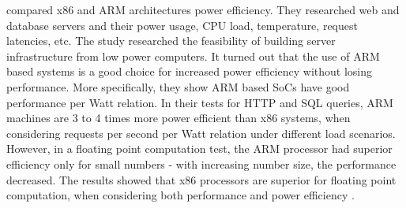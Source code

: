 \citeauthor{aroca2012towards} \cite{aroca2012towards}
compared x86 and ARM architectures power efficiency.
They researched web and database servers and their power usage, CPU load,
temperature, request latencies, etc.
The study researched the feasibility of building server infrastructure
from low power computers. It turned out that the use of ARM based systems
is a good choice for increased power efficiency without losing performance.
More specifically, they show ARM based SoCs have good performance per Watt relation.
In their tests for HTTP and SQL queries, ARM machines are 3 to 4 times
more power efficient than x86 systems, when considering 
requests per second per Watt relation under different load scenarios.
However, in a floating point computation test, the ARM processor had 
superior efficiency only for small numbers - with increasing number size,
the performance decreased. The results showed that x86 processors are superior
for floating point computation, when considering both performance and 
power efficiency
\cite{aroca2012towards}.
